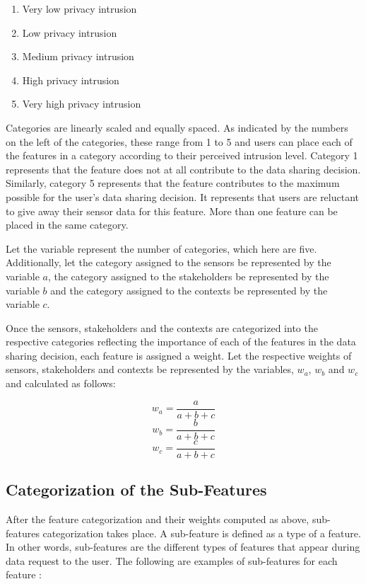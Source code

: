\begin{enumerate}
\item Very low privacy intrusion
\item Low privacy intrusion
\item Medium privacy intrusion
\item High privacy intrusion
\item Very high privacy intrusion
\end{enumerate}

Categories are linearly scaled and equally spaced. As indicated by the numbers on the left of the categories, these range from 1 to 5 and users can place each of the features in a category according to their perceived intrusion level. Category 1 represents that the feature does not at all contribute to the data sharing decision. Similarly, category 5 represents that the feature contributes to the maximum possible for the user's data sharing decision. It represents that users are reluctant to give away their sensor data for this feature. More than one feature can be placed in the same category.

Let the variable \numcategories represent the number of categories, which here are five. Additionally, let the category assigned to the sensors be represented by the variable $a$, the category assigned to the stakeholders be represented by the variable $b$ and the category assigned to the contexts be represented by the variable $c$.

Once the sensors, stakeholders and the contexts are categorized into the respective categories reflecting the importance of each of the features in the data sharing decision, each feature is assigned a weight. Let the respective weights of sensors, stakeholders and contexts be represented by the variables, $w_{a}$, $w_{b}$ and $w_{c}$ and calculated as follows:

\begin{equation}
   w_{a} = \frac{a}{a+b+c} 
\end{equation}
\begin{equation}
   w_{b} = \frac{b}{a+b+c}   
\end{equation}
\begin{equation}
   w_{c} = \frac{c}{a+b+c}   
\end{equation}

\subsection{Categorization of the Sub-Features}
After the feature categorization and their weights computed as above, sub-features categorization takes place. A sub-feature
is defined as a type of a feature. In other words, sub-features are the different types of features that appear during data request to the user. The following are examples of sub-features for each feature :

